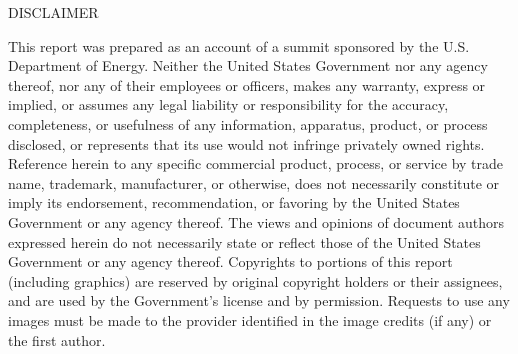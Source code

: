 \begin{center}
{\sc DISCLAIMER}
\end{center}

This report
was prepared as an account of a summit sponsored by the U.S. Department of Energy. Neither the United States Government nor any agency thereof, nor any of their employees or officers, makes any warranty, express or implied, or assumes any legal liability or responsibility for the accuracy, completeness, or usefulness of any information, apparatus, product, or process disclosed, or represents that its use would not infringe privately owned rights. Reference herein to any specific commercial product, process, or service by trade name, trademark, manufacturer, or otherwise, does not necessarily constitute or imply its endorsement, recommendation, or favoring by the United States Government or any agency thereof. The views and opinions of document authors expressed herein do not necessarily state or reflect those of the United States Government or any agency thereof. Copyrights to portions of this report (including graphics) are reserved by original copyright holders or their assignees, and are used by the Government’s license and by permission. Requests to use any images must be made to the provider identified in the image credits (if any) or the first author.
